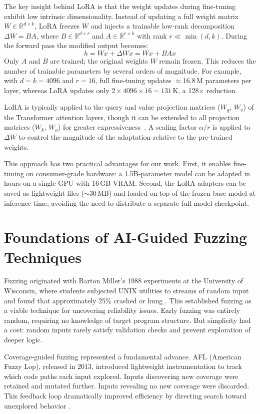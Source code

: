 The key insight behind LoRA is that the weight updates during fine-tuning exhibit low intrinsic dimensionality. Instead of updating a full weight matrix $W \in \mathbb{R}^{d \times k}$, LoRA freezes $W$ and injects a trainable low-rank decomposition $\Delta W = B A$, where $B \in \mathbb{R}^{d \times r}$ and $A \in \mathbb{R}^{r \times k}$ with rank $r \ll \min(d,k)$. During the forward pass the modified output becomes:
\[
h = W x + \Delta W x = W x + B A x
\]
Only $A$ and $B$ are trained; the original weights $W$ remain frozen. This reduces the number of trainable parameters by several orders of magnitude. For example, with $d = k = 4096$ and $r = 16$, full fine-tuning updates $\approx$16.8\,M parameters per layer, whereas LoRA updates only $2 \times 4096 \times 16 = 131$\,K, a 128$\times$ reduction.

LoRA is typically applied to the query and value projection matrices ($W_q$, $W_v$) of the Transformer attention layers, though it can be extended to all projection matrices ($W_k$, $W_o$) for greater expressiveness~\cite{Hu2021}. A scaling factor $\alpha / r$ is applied to $\Delta W$ to control the magnitude of the adaptation relative to the pre-trained weights.

This approach has two practical advantages for our work. First, it enables fine-tuning on consumer-grade hardware: a 1.5B-parameter model can be adapted in hours on a single GPU with 16\,GB VRAM. Second, the LoRA adapters can be saved as lightweight files ($\sim$30\,MB) and loaded on top of the frozen base model at inference time, avoiding the need to distribute a separate full model checkpoint.

\section{Foundations of AI-Guided Fuzzing Techniques}
\label{sec:lit_fuzzing_foundations}

Fuzzing originated with Barton Miller's 1988 experiments at the University of Wisconsin, where students subjected UNIX utilities to streams of random input and found that approximately 25\% crashed or hung \cite{Miller1990}. This established fuzzing as a viable technique for uncovering reliability issues. Early fuzzing was entirely random, requiring no knowledge of target program structure. But simplicity had a cost: random inputs rarely satisfy validation checks and prevent exploration of deeper logic.

Coverage-guided fuzzing represented a fundamental advance. AFL (American Fuzzy Lop), released in 2013, introduced lightweight instrumentation to track which code paths each input explored. Inputs discovering new coverage were retained and mutated further. Inputs revealing no new coverage were discarded. This feedback loop dramatically improved efficiency by directing search toward unexplored behavior \cite{AFLPlusPlus}.

